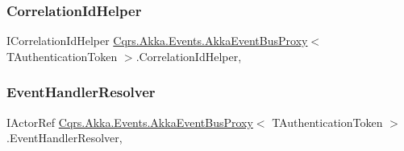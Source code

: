 \subsubsection{\texorpdfstring{Correlation\+Id\+Helper}{CorrelationIdHelper}}
{\footnotesize\ttfamily I\+Correlation\+Id\+Helper \hyperlink{classCqrs_1_1Akka_1_1Events_1_1AkkaEventBusProxy}{Cqrs.\+Akka.\+Events.\+Akka\+Event\+Bus\+Proxy}$<$ T\+Authentication\+Token $>$.Correlation\+Id\+Helper\hspace{0.3cm}{\ttfamily [get]}, {\ttfamily [protected]}}

\mbox{\label{classCqrs_1_1Akka_1_1Events_1_1AkkaEventBusProxy_abd36f5db7a03a38d573b11c0d6f37117_abd36f5db7a03a38d573b11c0d6f37117}} 
\subsubsection{\texorpdfstring{Event\+Handler\+Resolver}{EventHandlerResolver}}
{\footnotesize\ttfamily I\+Actor\+Ref \hyperlink{classCqrs_1_1Akka_1_1Events_1_1AkkaEventBusProxy}{Cqrs.\+Akka.\+Events.\+Akka\+Event\+Bus\+Proxy}$<$ T\+Authentication\+Token $>$.Event\+Handler\+Resolver\hspace{0.3cm}{\ttfamily [get]}, {\ttfamily [protected]}}

